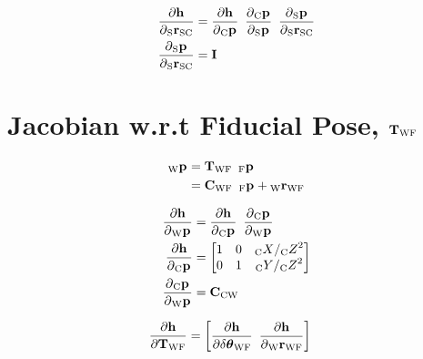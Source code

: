 \begin{align}
  \dfrac{\partial{\projFunc}}{\partial{\Pos{\sensor}{\cam}}}
    &=
      \dfrac{\partial{\projFunc}}{\partial{\Pt{\cam}}}
			\enspace
      \dfrac{\partial{\Pt{\cam}}}{\partial{\Pt{\sensor}}}
			\enspace
      \dfrac{\partial{\Pt{\sensor}}}{\partial{\Pos{\sensor}{\cam}}} \\
	\dfrac{\partial{\Pt{\sensor}}}{\partial{\Pos{\sensor}{\cam}}}
	  &= \I \\
\end{align}


\section{Jacobian w.r.t Fiducial Pose, $\Tf{\world}{\fiducial}$}

\begin{align}
\begin{split}
  \Pt{\world}
		&= \Tf{\world}{\fiducial}
			\enspace
			\Pt{\fiducial} \\
		&= \Rot{\world}{\fiducial}
			\enspace
			\Pt{\fiducial}
			+ \Trans{\world}{\fiducial}
\end{split}
\end{align}

\begin{align}
  \dfrac{\partial{\projFunc}}{\partial{\Pt{\world}}}
		&=
			\dfrac{\partial{\projFunc}}{\partial{\Pt{\cam}}}
			\enspace
			\dfrac{\partial{\Pt{\cam}}}{\partial{\Pt{\world}}} \\
  \dfrac{\partial{\projFunc}}{\partial{\Pt{\cam}}}
		&=
			\begin{bmatrix}
				1 & 0 & \KineNotationBare{X}{\cam} / \KineNotationBare{Z}{\cam}^{2} \\
				0 & 1 & \KineNotationBare{Y}{\cam} / \KineNotationBare{Z}{\cam}^{2}
			\end{bmatrix} \\
  \dfrac{\partial{\Pt{\cam}}}{\partial{\Pt{\world}}}
		&= \Rot{\cam}{\world}
\end{align}

\begin{align}
	\dfrac{\partial{\projFunc}}{\partial{\Tf{\world}{\fiducial}}}
		&=
			\begin{bmatrix}
        \dfrac{\partial \projFunc}{\partial \dtheta_{\world\fiducial}}
				\enspace
				\dfrac{\partial \projFunc}{\partial \Pos{\world}{\fiducial}}
			\end{bmatrix}
\end{align}

